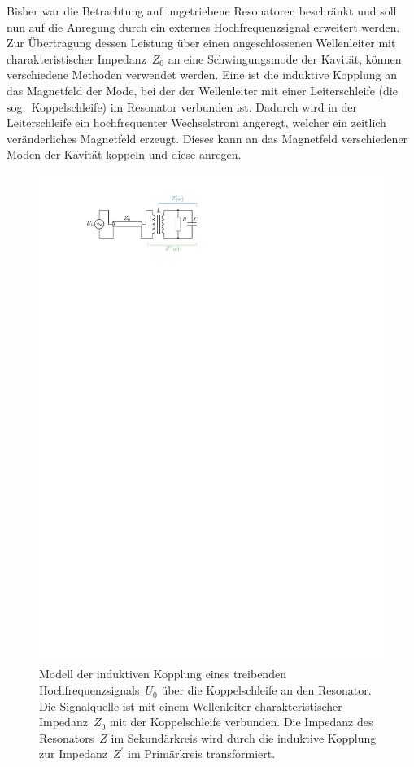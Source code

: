 Bisher war die Betrachtung auf ungetriebene Resonatoren beschränkt und soll nun auf die Anregung durch ein externes Hochfrequenzsignal erweitert werden.
Zur Übertragung dessen Leistung über einen angeschlossenen Wellenleiter mit charakteristischer Impedanz~$Z_0$ an eine Schwingungsmode der Kavität, können verschiedene Methoden verwendet werden.
Eine ist die induktive Kopplung an das Magnetfeld der Mode, bei der der Wellenleiter mit einer Leiterschleife (die sog.\ Koppelschleife) im Resonator verbunden ist.
Dadurch wird in der Leiterschleife ein hochfrequenter Wechselstrom angeregt, welcher ein zeitlich veränderliches Magnetfeld erzeugt. Dieses kann an das Magnetfeld verschiedener Moden der Kavität koppeln und diese anregen.
\begin{figure}[htb]
  \centering
  \includegraphics[scale=1.4]{./figs/RLC_coupling.pdf}
  \caption{Modell der induktiven Kopplung eines treibenden Hochfrequenzsignals~$U_0$ über die Koppelschleife an den Resonator. Die Signalquelle ist mit einem Wellenleiter charakteristischer Impedanz~$Z_0$ mit der Koppelschleife verbunden. Die Impedanz des Resonators~$Z$ im Sekundärkreis wird durch die induktive Kopplung zur Impedanz~$Z^\prime$ im Primärkreis transformiert.}
  \label{fig:rlc_coupling}
\end{figure}

